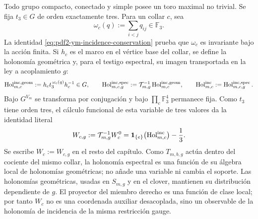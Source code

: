 Todo grupo compacto, conectado y simple posee un toro maximal no trivial. Se fija
$t_3\in G$ de orden exactamente tres. Para un collar $c$, sea
\begin{equation}\label{eq:pdf2-ym-owner-incidence-flux}
 \omega_c(q):=\sum_{i<j}q_{ij}\in\mathbb F_3.
\end{equation}
La identidad \eqref{eq:pdf2-ym-incidence-conservation} prueba que $\omega_c$ es
invariante bajo la acción finita. Si $h_c$ es el marco en el vértice base del collar,
se define la holonomía geométrica y, para el testigo espectral, su imagen transportada
en la ley a acoplamiento $g$:
\begin{equation}\label{eq:pdf2-ym-owner-incidence-holonomy}
 \operatorname{Hol}_{m,c}^{\rm inc,geom}:=h_ct_3^{\,\omega_c(q)}h_c^{-1}\in G,
 \qquad
 \operatorname{Hol}_{m,c,g}^{\rm inc,spec}
 :=\mathcal T_{m,g}^{-1}\operatorname{Hol}_{m,c}^{\rm inc,geom},
 \qquad
 \operatorname{Hol}_{m,c}^{\rm inc}:=\operatorname{Hol}_{m,c,g}^{\rm inc,spec}.
\end{equation}
Bajo $G^{V_m}$ se transforma por conjugación y bajo
$\prod_c\mathbb F_3^4$ permanece fija. Como $t_3$ tiene orden tres, el cálculo
funcional de esta variable de tres valores da la identidad literal
\begin{equation}\label{eq:pdf2-ym-owner-wc-curvature-functional}
 W_{c,g}:=\mathcal T_{m,g}^{-1}W_c^0
 =\mathbf1_{\{e\}}\!\left(\operatorname{Hol}_{m,c}^{\rm inc}\right)-\frac13.
\end{equation}
Se escribe $W_c:=W_{c,g}$ en el resto del capítulo.
Como $T_{m,b,g}$ actúa dentro del cociente del mismo collar, la holonomía espectral
es una función de su álgebra local de holonomías geométricas; no añade una variable
ni cambia el soporte. Las holonomías geométricas, usadas en $S_{m,g}$ y en el clover,
mantienen su distribución dependiente de $g$.
El proyector del miembro derecho es una función de clase local; por tanto $W_c$ no
es una coordenada auxiliar desacoplada, sino un observable de la holonomía de
incidencia de la misma restricción gauge.

